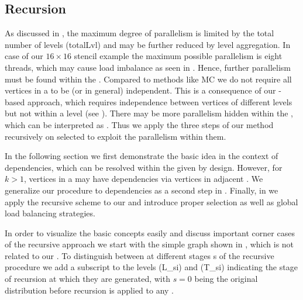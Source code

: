 	\subsection{Recursion}\label{subsec:REC}
As discussed in , the maximum degree of parallelism is limited
by the total number of levels (\acrshort{totalLvl}) and may be further reduced 
by level aggregation. In case of our
$16\times16$ stencil example the maximum possible parallelism 
is eight threads, which may cause load imbalance as seen in 
.
Hence, %
further parallelism must be found within the \levelGroups.
Compared to methods like \acrshort{MC} 
we do not require all vertices in a \levelGroup to be \DONE (or \DK in general) 
independent. This is a consequence of our \level-based approach, which
requires \DK independence between vertices of different levels but not 
within a level (see ). There may be more parallelism hidden within 
the \levelGroups,  which can be interpreted as \subgraphs.  Thus we apply the three 
steps of our method recursively on selected \subgraphs to exploit the parallelism 
within them.  

In the following section we first demonstrate the basic
idea in the context of \DONE dependencies, which can be resolved
within the given \levelGroup by design. However, for $k>1$, vertices in a
\levelGroup may have \DK dependencies via vertices in adjacent
\levelGroups. We generalize our procedure to \DK dependencies as a second step
in . Finally, in  we
apply the recursive scheme to our \stex and introduce proper \subgraph selection
as well as global load balancing strategies.

In order to visualize the basic concepts easily and discuss important corner
cases of the recursive approach we start with the simple graph shown in
, which is not related to our \stex. To distinguish
between \levelGroups at different stages \acrshort{s} of the recursive procedure
we add a subscript to the levels (\acrshort{L_si}) and \levelGroups
(\acrshort{T_si}) indicating the stage of recursion at which they are generated,
with $s=0$ being the original distribution before recursion is applied to any
\subgraph.

